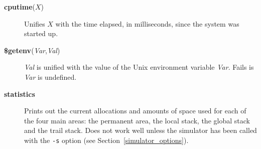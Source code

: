 \begin{description}
\item[{\bf cputime}($X$)] 
    Unifies $X$ with the time elapsed, in milliseconds,
    since the system was started up.

\item[{\bf \$getenv}({\em Var},{\em Val})]
    {\em Val} is unified with the value of the Unix environment variable
    {\em Var}.
    Fails is {\em Var} is undefined.

\item[{\bf statistics}] 
    Prints out the current allocations and amounts of space used for each of
    the four main areas: the permanent area, the local stack, the global stack
    and the trail stack.
    Does not work well unless the simulator has been called
    with the {\tt -s} option (see Section~\ref{simulator_options}).


\end{description}
